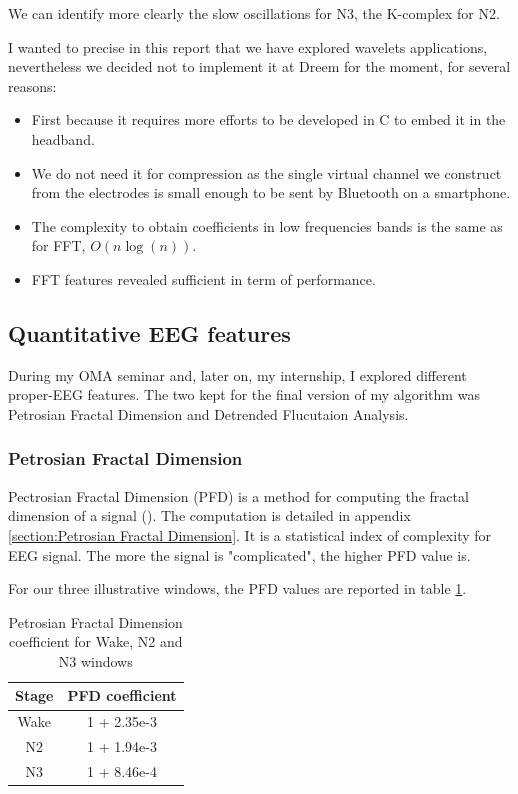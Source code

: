 \documentclass[12pt]{report}
\begin{document}
We can identify more clearly the slow oscillations for N3, the K-complex for N2.

I wanted to precise in this report that we have explored wavelets applications, nevertheless we decided not to implement it at Dreem for the moment, for several reasons:

\begin{itemize}
\item First because it requires more efforts to be developed in C to embed it in the headband.
\item We do not need it for compression as the single virtual channel we construct from the electrodes is small enough to be sent by Bluetooth on a smartphone.
\item The complexity to obtain coefficients in low frequencies bands is the same as for FFT, $O(n\log(n))$.
\item FFT features revealed sufficient in term of performance.
\end{itemize}

\subsection{Quantitative EEG features}

During my OMA seminar and, later on, my internship, I explored different proper-EEG features. The two kept for the final version of my algorithm was Petrosian Fractal Dimension and Detrended Flucutaion Analysis.

\subsubsection{Petrosian Fractal Dimension}

Pectrosian Fractal Dimension (PFD) is a method for computing the fractal dimension of a signal (\cite{esteller2001comparison}). The computation is detailed in appendix \ref{section:Petrosian Fractal Dimension}. It is a statistical index of complexity for EEG signal. The more the signal is "complicated", the higher PFD value is.

For our three illustrative windows, the PFD values are reported in table \ref{tab:pfd}.

\begin{table}[H]
\centering
\begin{tabular}{c|c}
Stage & PFD coefficient \\\hline
Wake & 1 + 2.35e-3 \\
N2 & 1 + 1.94e-3 \\
N3 & 1 + 8.46e-4 \\
\end{tabular}
\caption{\label{tab:pfd}Petrosian Fractal Dimension coefficient for Wake, N2 and N3 windows}
\end{table}
\end{document}
